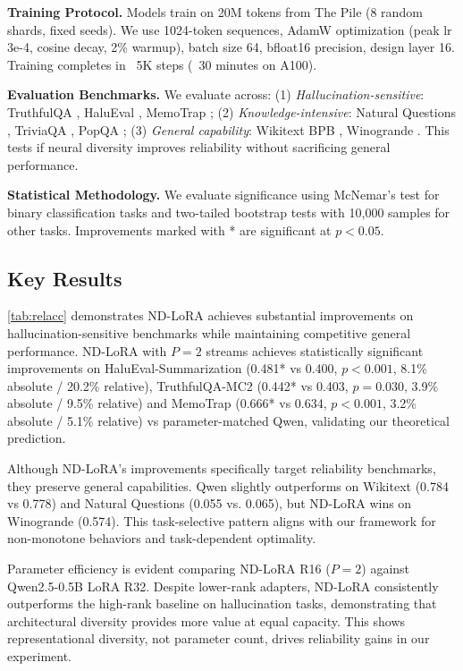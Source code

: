 \documentclass{article} %
\begin{document}
\textbf{Training Protocol.} Models train on 20M tokens from The Pile (8 random shards, fixed seeds). We use
1024-token sequences, AdamW optimization (peak lr 3e-4, cosine decay, 2\% warmup), batch size 64, bfloat16
precision, design layer 16. Training completes in ~5K steps (~30 minutes on A100).

\textbf{Evaluation Benchmarks.} We evaluate across: (1) \emph{Hallucination-sensitive}: TruthfulQA
\citep{lin2021truthfulqa}, HaluEval \citep{li2023halueval}, MemoTrap \citep{mckenzie2023inverse}; (2)
\emph{Knowledge-intensive}: Natural Questions \citep{kwiatkowski2019natural}, TriviaQA
\citep{joshi2017triviaqa}, PopQA \citep{mallen2023trust}; (3) \emph{General capability}: Wikitext BPB
\citep{merity2017pointer}, Winogrande \citep{sakaguchi2020winogrande}. This tests if neural diversity
improves reliability without sacrificing general performance.

\textbf{Statistical Methodology.} We evaluate significance using McNemar's test for binary classification
tasks and two-tailed bootstrap tests with 10,000 samples for other tasks. Improvements marked with * are
significant at $p < 0.05$.

\subsection{Key Results}
\autoref{tab:relacc} demonstrates ND-LoRA achieves substantial improvements on hallucination-sensitive
benchmarks while maintaining competitive general performance. ND-LoRA with $P=2$ streams achieves statistically
significant improvements on HaluEval-Summarization (0.481* vs 0.400, $p < 0.001$, 8.1\% absolute / 20.2\% relative),
TruthfulQA-MC2 (0.442* vs 0.403, $p = 0.030$, 3.9\% absolute / 9.5\% relative) and MemoTrap (0.666* vs 0.634, $p
< 0.001$, 3.2\% absolute / 5.1\% relative) vs parameter-matched Qwen, validating our theoretical prediction.

Although ND-LoRA's improvements specifically target reliability benchmarks, they preserve general
capabilities. Qwen slightly outperforms on Wikitext (0.784 vs 0.778) and Natural Questions
(0.055 vs. 0.065), but ND-LoRA wins on Winogrande (0.574). This task-selective pattern aligns with our
framework for non-monotone behaviors and task-dependent optimality.

Parameter efficiency is evident comparing ND-LoRA R16 ($P=2$) against Qwen2.5-0.5B LoRA R32. Despite lower-rank
adapters, ND-LoRA consistently outperforms the high-rank baseline on hallucination tasks, demonstrating that
architectural diversity provides more value at equal capacity. This shows representational diversity, not
parameter count, drives reliability gains in our experiment.
\end{document}
